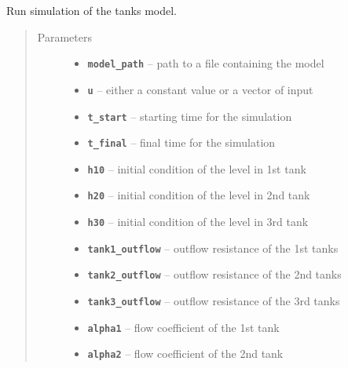 \documentclass[letterpaper,10pt,english]{sphinxmanual}
\begin{document}
\begin{fulllineitems}
\label{ds_tanks.tanks_utils:ds_tanks.tanks_utils.simulate_tanks}
Run simulation of the tanks model.
\begin{quote}\begin{description}
\item[{Parameters}] \leavevmode\begin{itemize}
\item {} 
\textbf{\texttt{model\_path}} -- path to a file containing the model

\item {} 
\textbf{\texttt{u}} -- either a constant value or a vector of input

\item {} 
\textbf{\texttt{t\_start}} -- starting time for the simulation

\item {} 
\textbf{\texttt{t\_final}} -- final time for the simulation

\item {} 
\textbf{\texttt{h10}} -- initial condition of the level in 1st tank

\item {} 
\textbf{\texttt{h20}} -- initial condition of the level in 2nd tank

\item {} 
\textbf{\texttt{h30}} -- initial condition of the level in 3rd tank

\item {} 
\textbf{\texttt{tank1\_outflow}} -- outflow resistance of the 1st tanks

\item {} 
\textbf{\texttt{tank2\_outflow}} -- outflow resistance of the 2nd tanks

\item {} 
\textbf{\texttt{tank3\_outflow}} -- outflow resistance of the 3rd tanks

\item {} 
\textbf{\texttt{alpha1}} -- flow coefficient of the 1st tank

\item {} 
\textbf{\texttt{alpha2}} -- flow coefficient of the 2nd tank


\end{itemize}
\end{description}
\end{quote}
\end{fulllineitems}
\end{document}
